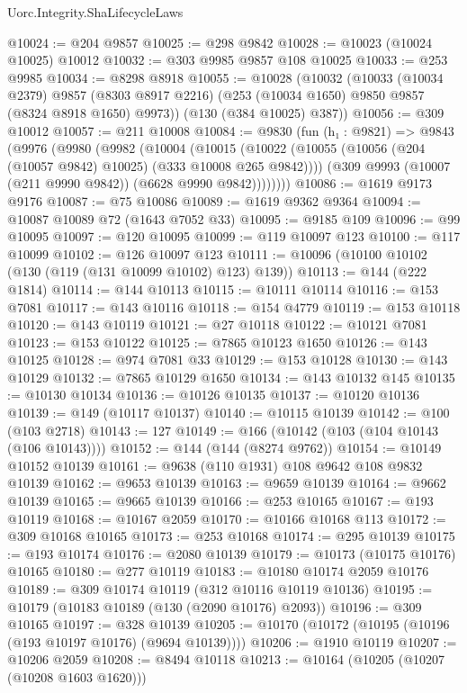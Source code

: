 \begin{lexlean}{Uorc.Integrity.ShaLifecycleLaws}
\begin{coremodule}
@10024 := @204 @9857
@10025 := @298 @9842
@10028 := @10023 (@10024 @10025) @10012
@10032 := @303 @9985 @9857 @108 @10025
@10033 := @253 @9985
@10034 := @8298 @8918
@10055 := @10028
    (@10032
      (@10033
        (@10034 @2379)
        @9857
        (@8303 @8917 @2216)
        (@253 (@10034 @1650) @9850 @9857 (@8324 @8918 @1650) @9973))
      (@130 (@384 @10025) @387))
@10056 := @309 @10012
@10057 := @211 @10008
@10084 := @9830
    (fun (h₁ : @9821) =>
    @9843
      (@9976
        (@9980
          (@9982
            (@10004
              (@10015
                (@10022 (@10055 (@10056 (@204 (@10057 @9842) @10025) (@333 @10008 @265 @9842))))
                (@309 @9993 (@10007 (@211 @9990 @9842)) (@6628 @9990 @9842))))))))
@10086 := @1619 @9173 @9176
@10087 := @75 @10086
@10089 := @1619 @9362 @9364
@10094 := @10087 @10089 @72 (@1643 @7052 @33)
@10095 := @9185 @109
@10096 := @99 @10095
@10097 := @120 @10095
@10099 := @119 @10097 @123
@10100 := @117 @10099
@10102 := @126 @10097 @123
@10111 := @10096 (@10100 @10102 (@130 (@119 (@131 @10099 @10102) @123) @139))
@10113 := @144 (@222 @1814)
@10114 := @144 @10113
@10115 := @10111 @10114
@10116 := @153 @7081
@10117 := @143 @10116
@10118 := @154 @4779
@10119 := @153 @10118
@10120 := @143 @10119
@10121 := @27 @10118
@10122 := @10121 @7081
@10123 := @153 @10122
@10125 := @7865 @10123 @1650
@10126 := @143 @10125
@10128 := @974 @7081 @33
@10129 := @153 @10128
@10130 := @143 @10129
@10132 := @7865 @10129 @1650
@10134 := @143 @10132 @145
@10135 := @10130 @10134
@10136 := @10126 @10135
@10137 := @10120 @10136
@10139 := @149 (@10117 @10137)
@10140 := @10115 @10139
@10142 := @100 (@103 @2718)
@10143 := 127
@10149 := @166 (@10142 (@103 (@104 @10143 (@106 @10143))))
@10152 := @144 (@144 (@8274 @9762))
@10154 := @10149 @10152 @10139
@10161 := @9638 (@110 @1931) @108 @9642 @108 @9832 @10139
@10162 := @9653 @10139
@10163 := @9659 @10139
@10164 := @9662 @10139
@10165 := @9665 @10139
@10166 := @253 @10165
@10167 := @193 @10119
@10168 := @10167 @2059
@10170 := @10166 @10168 @113
@10172 := @309 @10168 @10165
@10173 := @253 @10168
@10174 := @295 @10139
@10175 := @193 @10174
@10176 := @2080 @10139
@10179 := @10173 (@10175 @10176) @10165
@10180 := @277 @10119
@10183 := @10180 @10174 @2059 @10176
@10189 := @309 @10174 @10119 (@312 @10116 @10119 @10136)
@10195 := @10179 (@10183 @10189 (@130 (@2090 @10176) @2093))
@10196 := @309 @10165
@10197 := @328 @10139
@10205 := @10170 (@10172 (@10195 (@10196 (@193 @10197 @10176) (@9694 @10139))))
@10206 := @1910 @10119
@10207 := @10206 @2059
@10208 := @8494 @10118
@10213 := @10164 (@10205 (@10207 (@10208 @1603 @1620)))

\end{coremodule}
\end{lexlean}
